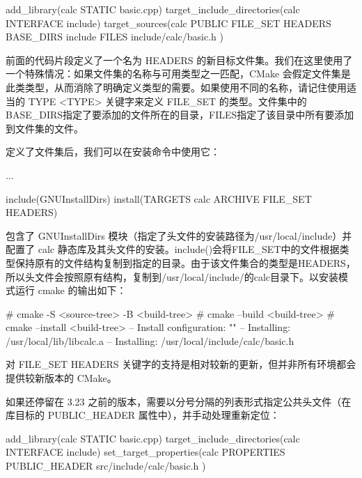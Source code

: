 
\begin{cmake}
add_library(calc STATIC basic.cpp)
target_include_directories(calc INTERFACE include)
target_sources(calc PUBLIC FILE_SET HEADERS
                           BASE_DIRS include
                           FILES include/calc/basic.h
)
\end{cmake}

前面的代码片段定义了一个名为 HEADERS 的新目标文件集。我们在这里使用了一个特殊情况：如果文件集的名称与可用类型之一匹配，CMake 会假定文件集是此类类型，从而消除了明确定义类型的需要。如果使用不同的名称，请记住使用适当的 TYPE <TYPE> 关键字来定义 FILE\_SET 的类型。文件集中的BASE\_DIRS指定了要添加的文件所在的目录，FILES指定了该目录中所有要添加到文件集的文件。

定义了文件集后，我们可以在安装命令中使用它：


\begin{cmake}
...

include(GNUInstallDirs)
install(TARGETS calc ARCHIVE FILE_SET HEADERS)
\end{cmake}

包含了 GNUInstallDirs 模块（指定了头文件的安装路径为/usr/local/include）并配置了 calc 静态库及其头文件的安装。include()会将FILE\_SET中的文件根据类型保持原有的文件结构复制到指定的目录。由于该文件集合的类型是HEADERS，所以头文件会按照原有结构，复制到/usr/local/include/的calc目录下。以安装模式运行 cmake 的输出如下：

\begin{shell}
# cmake -S <source-tree> -B <build-tree>
# cmake --build <build-tree>
# cmake --install <build-tree>
-- Install configuration: ""
-- Installing: /usr/local/lib/libcalc.a
-- Installing: /usr/local/include/calc/basic.h
\end{shell}

对 FILE\_SET HEADERS 关键字的支持是相对较新的更新，但并非所有环境都会提供较新版本的 CMake。

如果还停留在 3.23 之前的版本，需要以分号分隔的列表形式指定公共头文件（在库目标的 PUBLIC\_HEADER 属性中），并手动处理重新定位：


\begin{cmake}
add_library(calc STATIC basic.cpp)
target_include_directories(calc INTERFACE include)
set_target_properties(calc PROPERTIES
    PUBLIC_HEADER src/include/calc/basic.h
)
\end{cmake}

